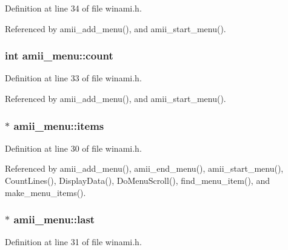 Definition at line 34 of file winami.\+h.



Referenced by amii\+\_\+add\+\_\+menu(), and amii\+\_\+start\+\_\+menu().

\hypertarget{structamii__menu_a6498bbd7c8a254b78e3cf333f3ce3318}{
\subsubsection[{count}]{\setlength{\rightskip}{0pt plus 5cm}int amii\+\_\+menu\+::count}}\label{structamii__menu_a6498bbd7c8a254b78e3cf333f3ce3318}


Definition at line 33 of file winami.\+h.



Referenced by amii\+\_\+add\+\_\+menu(), and amii\+\_\+start\+\_\+menu().

\hypertarget{structamii__menu_a01d8d53511bbcb518c8c721c42a1168d}{
\subsubsection[{items}]{$\ast$ amii\+\_\+menu\+::items}}\label{structamii__menu_a01d8d53511bbcb518c8c721c42a1168d}


Definition at line 30 of file winami.\+h.



Referenced by amii\+\_\+add\+\_\+menu(), amii\+\_\+end\+\_\+menu(), amii\+\_\+start\+\_\+menu(), Count\+Lines(), Display\+Data(), Do\+Menu\+Scroll(), find\+\_\+menu\+\_\+item(), and make\+\_\+menu\+\_\+items().

\hypertarget{structamii__menu_a9bcaeffce2bc3c2bfbac65309e3f80ce}{
\subsubsection[{last}]{$\ast$ amii\+\_\+menu\+::last}}\label{structamii__menu_a9bcaeffce2bc3c2bfbac65309e3f80ce}


Definition at line 31 of file winami.\+h.



